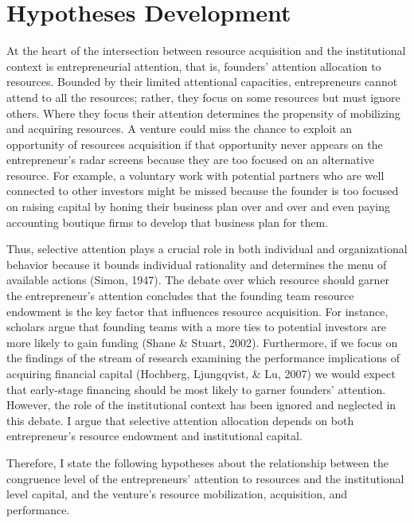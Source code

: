 \documentclass[
  english,
  man]{apa6}
\begin{document}
\hypertarget{hypotheses-development}{%
\section{Hypotheses Development}\label{hypotheses-development}}

At the heart of the intersection between resource acquisition and the institutional context is entrepreneurial attention, that is, founders' attention allocation to resources. Bounded by their limited attentional capacities, entrepreneurs cannot attend to all the resources; rather, they focus on some resources but must ignore others. Where they focus their attention determines the propensity of mobilizing and acquiring resources. A venture could miss the chance to exploit an opportunity of resources acquisition if that opportunity never appears on the entrepreneur's radar screens because they are too focused on an alternative resource. For example, a voluntary work with potential partners who are well connected to other investors might be missed because the founder is too focused on raising capital by honing their business plan over and over and even paying accounting boutique firms to develop that business plan for them.

Thus, selective attention plays a crucial role in both individual and organizational behavior because it bounds individual rationality and determines the menu of available actions (Simon, 1947). The debate over which resource should garner the entrepreneur's attention concludes that the founding team resource endowment is the key factor that influences resource acquisition. For instance, scholars argue that founding teams with a more ties to potential investors are more likely to gain funding (Shane \& Stuart, 2002). Furthermore, if we focus on the findings of the stream of research examining the performance implications of acquiring financial capital (Hochberg, Ljungqvist, \& Lu, 2007) we would expect that early-stage financing should be most likely to garner founders' attention. However, the role of the institutional context has been ignored and neglected in this debate. I argue that selective attention allocation depends on both entrepreneur's resource endowment and institutional capital.

Therefore, I state the following hypotheses about the relationship between the congruence level of the entrepreneurs' attention to resources and the institutional level capital, and the venture's resource mobilization, acquisition, and performance.
\end{document}
